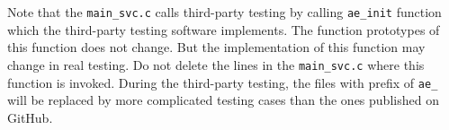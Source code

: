   Note that the \verb+main_svc.c+ calls third-party testing by calling \verb+ae_init+ function which the third-party testing software implements. The function prototypes of this function does not change. But the implementation of this function may change in real testing.
Do not delete the lines in the \verb+main_svc.c+ where this function is invoked.
During the third-party testing, the files with prefix of \verb+ae_+ will be replaced by more complicated testing cases than the ones published on GitHub. 

